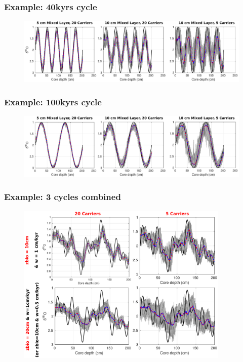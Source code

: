 \documentclass{beamer}
\begin{document}
\begin{frame}
\frametitle{Example: 40kyrs cycle}
\begin{figure}[hbtp]
\hspace*{-0.8cm}\includegraphics[width=1.1\textwidth]{figures/JustABU_40kyr_cycle.pdf}%
\end{figure}
\end{frame}

\begin{frame}
\frametitle{Example: 100kyrs cycle}
\begin{figure}[hbtp]
\hspace*{-0.8cm}\includegraphics[width=1.1\textwidth]{figures/JustABU_100kyr_cycle.pdf}%
\end{figure}
\end{frame}


\begin{frame}
\frametitle{Example: 3 cycles combined}
\begin{figure}[hbtp]
\hspace*{-0.8cm}\includegraphics[width=0.9\textwidth]{figures/JustABU_3ycles_combined.pdf}%
\end{figure}
\end{frame}
\end{document}
